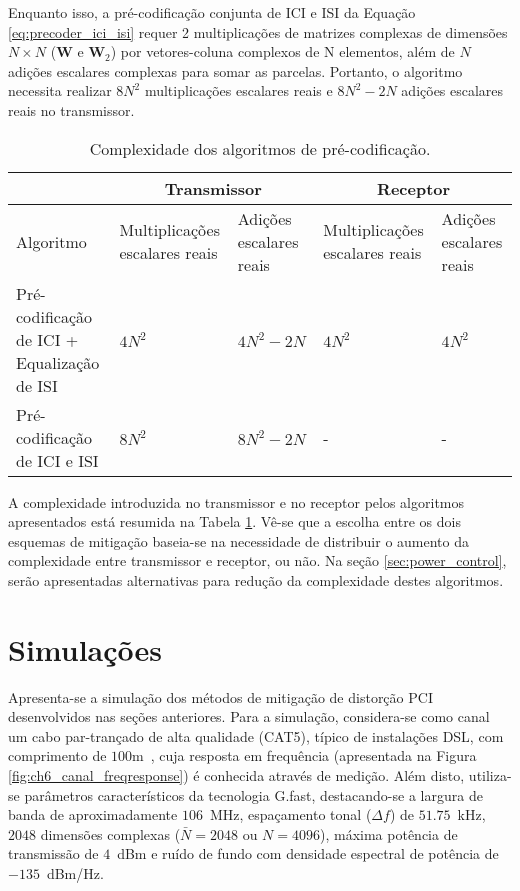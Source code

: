 Enquanto isso, a pré-codificação conjunta de ICI e ISI da Equação \ref{eq:precoder_ici_isi} requer 2 multiplicações de matrizes complexas de dimensões $N \times N$ ($\mathbf{W}$ e $\mathbf{W}_2$) por vetores-coluna complexos de N elementos, além de $N$ adições escalares complexas para somar as parcelas. Portanto, o algoritmo necessita realizar $8N^2$ multiplicações escalares reais e $8N^2 - 2N$ adições escalares reais no transmissor.

\begin{table}[htbp]
\centering
\begin{tabular}{ p{5cm} | p{2.5 cm} | p{2.5cm} | p{2.5cm} | p{2.5cm} |}
 & \multicolumn{2}{|c|}{Transmissor} & \multicolumn{2}{|c|}{Receptor}\\
\hline
Algoritmo & Multiplicações escalares reais & Adições escalares reais & Multiplicações escalares reais & Adições escalares reais\\
\hline
Pré-codificação de ICI + Equalização de ISI & $4N^2$ & $4N^2 - 2N$ & $4N^2$ & $4N^2$\\
\hline
Pré-codificação de ICI e ISI & $8N^2$ & $8N^2 - 2N$ & - & - \\
\hline
\end{tabular}
\caption{Complexidade dos algoritmos de pré-codificação. \label{tb:complexidade_dp}}
\end{table}

A complexidade introduzida no transmissor e no receptor pelos algoritmos apresentados está resumida na Tabela \ref{tb:complexidade_dp}. Vê-se que a escolha entre os dois esquemas de mitigação baseia-se na necessidade de distribuir o aumento da complexidade entre transmissor e receptor, ou não. Na seção \ref{sec:power_control}, serão apresentadas alternativas para redução da complexidade destes algoritmos.

\section{Simulações}
\label{sec:ici_isi_pre_sim}

Apresenta-se a simulação dos métodos de mitigação de distorção PCI desenvolvidos nas seções anteriores. Para a simulação, considera-se como canal um cabo par-trançado de alta qualidade (CAT5), típico de instalações DSL, com comprimento de $100$m~, cuja resposta em frequência (apresentada na Figura \ref{fig:ch6_canal_freqresponse}) é conhecida através de medição. Além disto, utiliza-se parâmetros característicos da tecnologia G.fast, destacando-se a largura de banda de aproximadamente $106$~MHz, espaçamento tonal ($\Delta f$) de $51.75$~kHz, $2048$ dimensões complexas ($\bar{N}=2048$ ou $N=4096$), máxima potência de transmissão de $4$~dBm e ruído de fundo com densidade espectral de potência de $-135$~dBm/Hz. 

